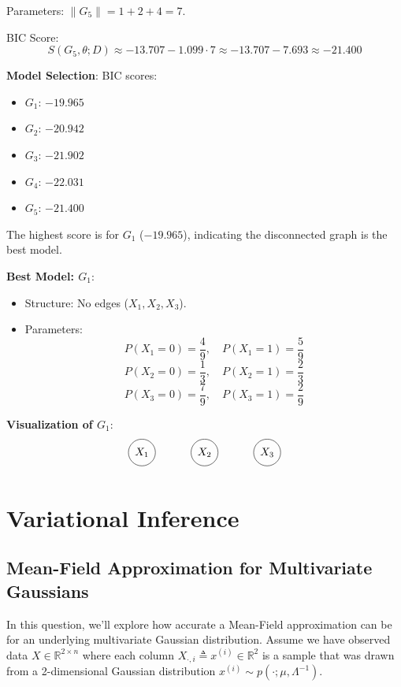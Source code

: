 \documentclass[a3paper,12pt]{extarticle} %
\begin{document}
Parameters: \(\|G_5\| = 1 + 2 + 4 = 7\).

BIC Score:
\[
S(G_5, \theta; D) \approx -13.707 - 1.099 \cdot 7 \approx -13.707 - 7.693 \approx -21.400
\]

\textbf{Model Selection}:
BIC scores:
\begin{itemize}
    \item \(G_1\): \(-19.965\)
    \item \(G_2\): \(-20.942\)
    \item \(G_3\): \(-21.902\)
    \item \(G_4\): \(-22.031\)
    \item \(G_5\): \(-21.400\)
\end{itemize}

The highest score is for \(G_1\) (\(-19.965\)), indicating the disconnected graph is the best model.

\textbf{Best Model: \(G_1\)}:
\begin{itemize}
    \item Structure: No edges (\(X_1, X_2, X_3\)).
    \item Parameters:
    \[
    P(X_1 = 0) = \frac{4}{9}, \quad P(X_1 = 1) = \frac{5}{9}
    \]
    \[
    P(X_2 = 0) = \frac{1}{3}, \quad P(X_2 = 1) = \frac{2}{3}
    \]
    \[
    P(X_3 = 0) = \frac{7}{9}, \quad P(X_3 = 1) = \frac{2}{9}
    \]
\end{itemize}

\textbf{Visualization of \(G_1\)}:
\[
\begin{tikzpicture}
    \node[circle, draw] (X1) at (0,0) {$X_1$};
    \node[circle, draw] (X2) at (2,0) {$X_2$};
    \node[circle, draw] (X3) at (4,0) {$X_3$};
\end{tikzpicture}
\]

\newpage
\section{Variational Inference}
\subsection{Mean-Field Approximation for Multivariate Gaussians}
In this question, we’ll explore how accurate a Mean-Field approximation can be for an underlying multivariate Gaussian distribution. Assume we have observed data \( X \in \mathbb{R}^{2 \times n} \) where each column \( X_{\cdot,i} \triangleq x^{(i)} \in \mathbb{R}^2 \) is a sample that was drawn from a 2-dimensional Gaussian distribution \( x^{(i)} \sim p(\cdot; \mu, \Lambda^{-1}) \).
\end{document}

